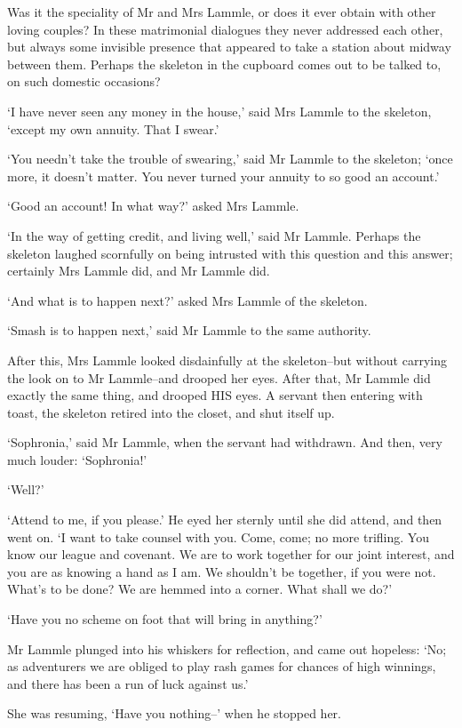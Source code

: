 Was it the speciality of Mr and Mrs Lammle, or does it ever obtain
with other loving couples? In these matrimonial dialogues they never
addressed each other, but always some invisible presence that appeared
to take a station about midway between them. Perhaps the skeleton in the
cupboard comes out to be talked to, on such domestic occasions?

‘I have never seen any money in the house,’ said Mrs Lammle to the
skeleton, ‘except my own annuity. That I swear.’

‘You needn’t take the trouble of swearing,’ said Mr Lammle to the
skeleton; ‘once more, it doesn’t matter. You never turned your annuity
to so good an account.’

‘Good an account! In what way?’ asked Mrs Lammle.

‘In the way of getting credit, and living well,’ said Mr Lammle. Perhaps
the skeleton laughed scornfully on being intrusted with this question
and this answer; certainly Mrs Lammle did, and Mr Lammle did.

‘And what is to happen next?’ asked Mrs Lammle of the skeleton.

‘Smash is to happen next,’ said Mr Lammle to the same authority.

After this, Mrs Lammle looked disdainfully at the skeleton--but without
carrying the look on to Mr Lammle--and drooped her eyes. After that, Mr
Lammle did exactly the same thing, and drooped HIS eyes. A servant then
entering with toast, the skeleton retired into the closet, and shut
itself up.

‘Sophronia,’ said Mr Lammle, when the servant had withdrawn. And then,
very much louder: ‘Sophronia!’

‘Well?’

‘Attend to me, if you please.’ He eyed her sternly until she did attend,
and then went on. ‘I want to take counsel with you. Come, come; no more
trifling. You know our league and covenant. We are to work together for
our joint interest, and you are as knowing a hand as I am. We shouldn’t
be together, if you were not. What’s to be done? We are hemmed into a
corner. What shall we do?’

‘Have you no scheme on foot that will bring in anything?’

Mr Lammle plunged into his whiskers for reflection, and came out
hopeless: ‘No; as adventurers we are obliged to play rash games for
chances of high winnings, and there has been a run of luck against us.’

She was resuming, ‘Have you nothing--’ when he stopped her.

